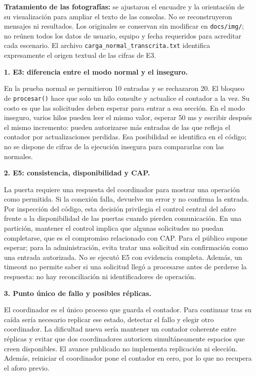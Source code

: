 \documentclass[11pt,a4paper]{article}
\newcommand{\apartado}[1]{\par\vspace{4pt}{\large\bfseries\color{verde}#1}\par\vspace{2pt}}
\begin{document}
\textbf{Tratamiento de las fotografías:} se ajustaron el encuadre y la orientación de su visualización para ampliar el texto de las consolas. No se reconstruyeron mensajes ni resultados. Los originales se conservan sin modificar en \texttt{docs/img/}; no reúnen todos los datos de usuario, equipo y fecha requeridos para acreditar cada escenario. El archivo \texttt{carga\_normal\_transcrita.txt} identifica expresamente el origen textual de las cifras de E3.

\newpage
\apartado{4. Respuestas de análisis}

\textbf{1. E3: diferencia entre el modo normal y el inseguro.}\par
En la prueba normal se permitieron 10 entradas y se rechazaron 20. El bloqueo de \texttt{procesar()} hace que solo un hilo consulte y actualice el contador a la vez. Su costo es que las solicitudes deben esperar para entrar a esa sección. En el modo inseguro, varios hilos pueden leer el mismo valor, esperar 50 ms y escribir después el mismo incremento: pueden autorizarse más entradas de las que refleja el contador por actualizaciones perdidas. Esa posibilidad se identifica en el código; no se dispone de cifras de la ejecución insegura para compararlas con las normales.

\textbf{2. E5: consistencia, disponibilidad y CAP.}\par
La puerta requiere una respuesta del coordinador para mostrar una operación como permitida. Si la conexión falla, devuelve un error y no confirma la entrada. Por inspección del código, esta decisión privilegia el control central del aforo frente a la disponibilidad de las puertas cuando pierden comunicación. En una partición, mantener el control implica que algunas solicitudes no puedan completarse, que es el compromiso relacionado con CAP. Para el público supone esperar; para la administración, evita tratar una solicitud sin confirmación como una entrada autorizada. No se ejecutó E5 con evidencia completa. Además, un timeout no permite saber si una solicitud llegó a procesarse antes de perderse la respuesta: no hay reconciliación ni identificadores de operación.

\textbf{3. Punto único de fallo y posibles réplicas.}\par
El coordinador es el único proceso que guarda el contador. Para continuar tras su caída sería necesario replicar ese estado, detectar el fallo y elegir otro coordinador. La dificultad nueva sería mantener un contador coherente entre réplicas y evitar que dos coordinadores autoricen simultáneamente espacios que creen disponibles. El avance publicado no implementa replicación ni elección. Además, reiniciar el coordinador pone el contador en cero, por lo que no recupera el aforo previo.
\end{document}
